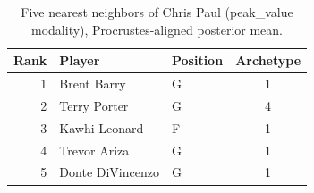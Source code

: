 \begin{table}[htbp]
  \centering\small
  \begin{tabular}{rllc}
    \toprule
    Rank & Player & Position & Archetype \\
    \midrule
    1 & Brent Barry & G & 1 \\
    2 & Terry Porter & G & 4 \\
    3 & Kawhi Leonard & F & 1 \\
    4 & Trevor Ariza & G & 1 \\
    5 & Donte DiVincenzo & G & 1 \\
    \bottomrule
  \end{tabular}
  \caption{Five nearest neighbors of Chris Paul (peak_value modality), Procrustes-aligned posterior mean.}
  \label{tab:Chris_Paul_neighbors_peak_value}
\end{table}

